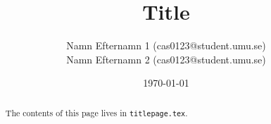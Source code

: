 \title{Title}
\author{Namn Efternamn 1 (cas0123@student.umu.se) \\
        Namn Efternamn 2 (cas0123@student.umu.se)}
\date{\today}

\begin{titlepage}
  \maketitle
  \thispagestyle{fancy}
  \rhead{\today}
  \begin{abstract}
    The contents of this page lives in \texttt{titlepage.tex}.
  \end{abstract}
\end{titlepage}
